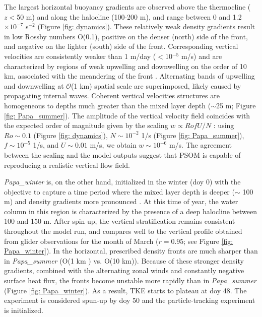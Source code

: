\documentclass[draft,linenumbers]{agujournal2018}
\begin{document}
The largest horizontal buoyancy gradients are observed above the thermocline ($z<$50 m) and along the halocline (100-200 m), and range between 0 and 1.2$\times 10^{-7}$ s$^{-2}$ (Figure \ref{fig: dynamics}). These relatively weak density gradients result in low Rossby numbers O(0.1), positive on the denser (north) side of the front, and negative on the lighter (south) side of the front. Corresponding vertical velocities are consistently weaker than 1 m/day ($<$10$^{-5}$ m/s) and are characterized by regions of weak upwelling and downwelling on the order of 10 km, associated with the meandering of the front \citep{Bower_1989}. Alternating bands of upwelling and downwelling at $\mathcal{O}$(1 km) spatial scale are superimposed, likely caused by propagating internal waves. Coherent vertical velocities structures are homogeneous to depths much greater than the mixed layer depth ($\sim$25 m; Figure \ref{fig: Papa_summer}). The amplitude of the vertical velocity field coincides with the expected order of magnitude given by the scaling $w \propto RofU/N$ \citep{Mahadevan_2016}: using $Ro\sim0.1$ (Figure \ref{fig: dynamics}), $N\sim10^{-2}$ 1/s (Figure \ref{fig: Papa_summer}), $f\sim10^{-5}$ 1/s, and $U\sim0.01$ m/s, we obtain $w\sim 10^{-6}$ m/s. The agreement between the scaling and the model outputs suggest that PSOM is capable of reproducing a realistic vertical flow field.

\textit{Papa\_winter} is, on the other hand, initialized in the winter (doy 0) with the objective to capture a time period where the mixed layer depth is deeper ($\sim$ 100 m) and density gradients more pronounced \citep{Pelland_2016}. At this time of year, the water column in this region is characterized by the presence of a deep halocline between 100 and 150 m. After spin-up, the vertical stratification remains consistent throughout the model run, and compares well to the vertical profile obtained from glider observations for the month of March ($r = 0.95$; see Figure \ref{fig: Papa_winter}). In the horizontal, prescribed density fronts are much sharper than in \textit{Papa\_summer} (O(1 km ) vs. O(10 km)). Because of these stronger density gradients, combined with the alternating zonal winds and constantly negative surface heat flux, the fronts become unstable more rapidly than in \textit{Papa\_summer} (Figure \ref{fig: Papa_winter}). As a result, TKE starts to plateau at doy 48. The experiment is considered spun-up by doy 50 and the particle-tracking experiment is initialized. %
\end{document}
